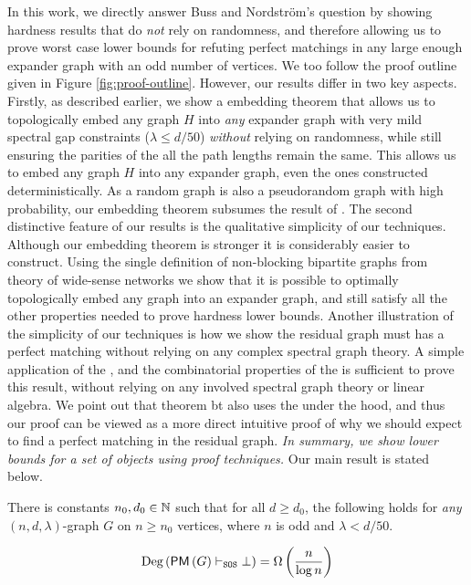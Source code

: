 \documentclass[11pt]{article}
\begin{document}
In this work, we directly answer Buss and Nordstr{\"o}m's question by showing hardness results that do \emph{not} rely on randomness, and therefore allowing us to prove worst case lower bounds for refuting perfect matchings in any large enough expander graph with an odd number of vertices.
We too follow the proof outline given in Figure \ref{fig:proof-outline}.
However, our results differ in two key aspects.
Firstly, as described earlier, we show a embedding theorem that allows us to topologically embed any graph $H$ into \emph{any} expander graph with very mild spectral gap constraints ($\lambda \leq d/50$) \emph{without} relying on randomness, while still ensuring the parities of the all the path lengths remain the same.
This allows us to embed any graph $H$ into any expander graph, even the ones constructed deterministically.
As a random graph is also a pseudorandom graph with high probability, our embedding theorem subsumes the result of \citet{Austrin_2022}.
The second distinctive feature of our results is the qualitative simplicity of our techniques.
Although our embedding theorem is stronger it is considerably easier to construct.
Using the single definition of non-blocking bipartite graphs from theory of wide-sense networks \citep{feldman1988wide} we show that it is possible to optimally topologically embed any graph into an expander graph, and still satisfy all the other properties needed to prove hardness lower bounds.
Another illustration of the simplicity of our techniques is how we show the residual graph must has a perfect matching without relying on any complex spectral graph theory.
A simple application of the , and the combinatorial properties of the  is sufficient to prove this result, without relying on any involved spectral graph theory or linear algebra.
We point out that theorem bt \citet[Theorem 2.3]{brouwer2005eigenvalues} also uses the  under the hood, and thus our proof can be viewed as a more direct intuitive proof of why we should expect to find a perfect matching in the residual graph.
\textit{In summary, we show  lower bounds for a  set of objects using  proof techniques.
} Our main result is stated below.

\begin{theorem}\label{thm:main-thm}

  There is constants $n_0, d_0 \in \mathbb{N}$ such that for all $d \geq d_0$, the following holds for \emph{any} $(n, d, \lambda)$-graph $G$ on $n \geq n_0$ vertices, where $n$ is odd and $\lambda < d/50$.

  \[ \text{Deg}\left(\mathsf{PM}\left(G\right) \vdash_{\texttt{SOS}} \bot\right) = \Omega\left(\frac{n}{\log n}\right)\]

\end{theorem}
\end{document}
